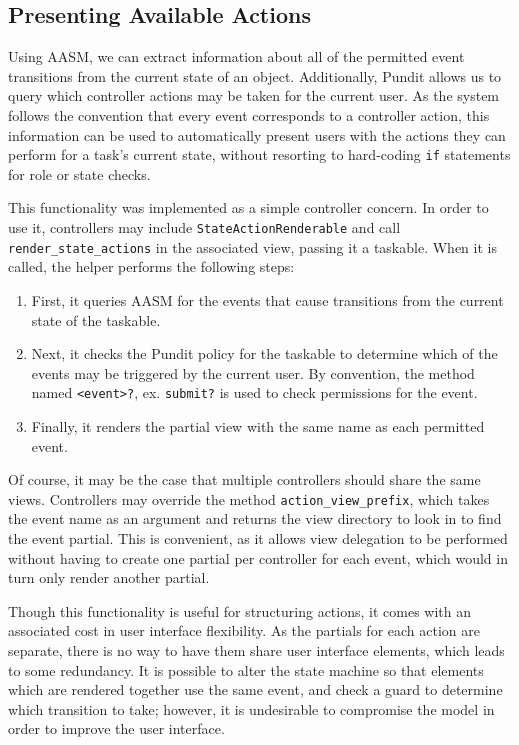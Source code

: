 \documentclass[document.tex]{subfiles}
\begin{document}
\FloatBarrier

\subsection {Presenting Available Actions}

Using AASM, we can extract information about all of the permitted event transitions from the current state of an object. Additionally, Pundit allows us to query which controller actions may be taken for the current user. As the system follows the convention that every event corresponds to a controller action, this information can be used to automatically present users with the actions they can perform for a task's current state, without resorting to hard-coding \verb!if! statements for role or state checks.

This functionality was implemented as a simple controller concern. In order to use it, controllers may include \verb!StateActionRenderable! and call 
\verb!render_state_actions! in the associated view, passing it a taskable. When it is called, the helper performs the following steps:
\begin{enumerate}
\item First, it queries AASM for the events that cause transitions from the current state of the taskable.
\item Next, it checks the Pundit policy for the taskable to determine which of the events may be triggered by the current user. By convention, the method named \verb!<event>?!, ex. \verb!submit?! is used to check permissions for the event.
\item Finally, it renders the partial view with the same name as each permitted event.
\end{enumerate}

Of course, it may be the case that multiple controllers should share the same views. Controllers may override the method \verb!action_view_prefix!, which takes the event name as an argument and returns the view directory to look in to find the event partial. This is convenient, as it allows view delegation to be performed without having to create one partial per controller for each event, which would in turn only render another partial.

Though this functionality is useful for structuring actions, it comes with an associated cost in user interface flexibility. As the partials for each action are separate, there is no way to have them share user interface elements, which leads to some redundancy. It is possible to alter the state machine so that elements which are rendered together use the same event, and check a guard to determine which transition to take; however, it is undesirable to compromise the model in order to improve the user interface. 
\end{document}
